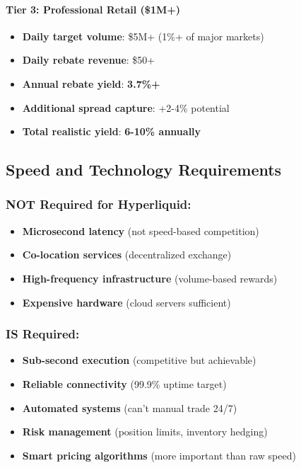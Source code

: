 \hypertarget{tier-3-professional-retail-1m}{%
\paragraph{Tier 3: Professional Retail
(\$1M+)}\label{tier-3-professional-retail-1m}}

\begin{itemize}
\tightlist
\item
  \textbf{Daily target volume}: \$5M+ (1\%+ of major markets)
\item
  \textbf{Daily rebate revenue}: \$50+
\item
  \textbf{Annual rebate yield}: \textbf{3.7\%+}
\item
  \textbf{Additional spread capture}: +2-4\% potential
\item
  \textbf{Total realistic yield}: \textbf{6-10\% annually}
\end{itemize}

\hypertarget{speed-and-technology-requirements}{%
\subsection{Speed and Technology
Requirements}\label{speed-and-technology-requirements}}

\hypertarget{not-required-for-hyperliquid}{%
\subsubsection{NOT Required for
Hyperliquid:}\label{not-required-for-hyperliquid}}

\begin{itemize}
\tightlist
\item
  \textbf{Microsecond latency} (not speed-based competition)
\item
  \textbf{Co-location services} (decentralized exchange)
\item
  \textbf{High-frequency infrastructure} (volume-based rewards)
\item
  \textbf{Expensive hardware} (cloud servers sufficient)
\end{itemize}

\hypertarget{is-required}{%
\subsubsection{IS Required:}\label{is-required}}

\begin{itemize}
\tightlist
\item
  \textbf{Sub-second execution} (competitive but achievable)
\item
  \textbf{Reliable connectivity} (99.9\% uptime target)
\item
  \textbf{Automated systems} (can't manual trade 24/7)
\item
  \textbf{Risk management} (position limits, inventory hedging)
\item
  \textbf{Smart pricing algorithms} (more important than raw speed)
\end{itemize}

